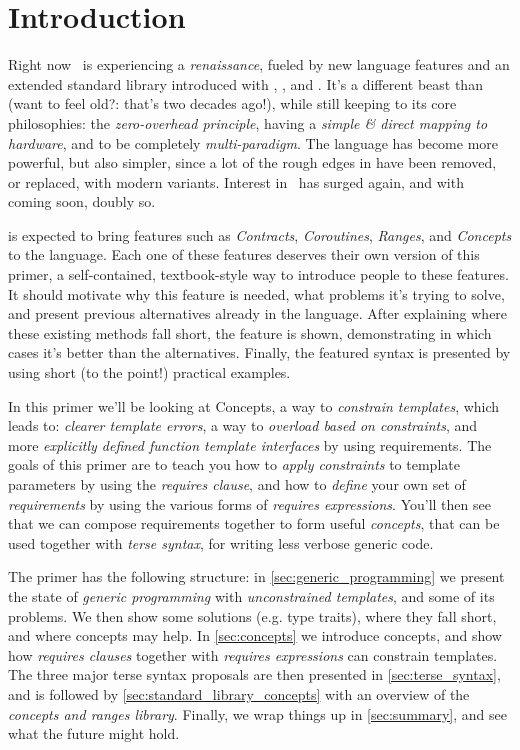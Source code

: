 \section{Introduction} \label{sec:introduction}

Right now \Cpp\ is experiencing a \emph{renaissance}, fueled by new language features and an extended standard library introduced with , , and . It's a different beast than  (want to feel old?: that's two decades ago!), while still keeping to its core philosophies: the \emph{zero-overhead principle}, having a \emph{simple \& direct mapping to hardware}, and to be completely \emph{multi-paradigm}. The language has become more powerful, but also simpler, since a lot of the rough edges in  have been removed, or replaced, with modern variants. Interest in \Cpp\ has surged again, and with  coming soon\texttrademark, doubly so.

 is expected to bring features such as \emph{Contracts}, \emph{Coroutines}, \emph{Ranges}, and \emph{Concepts} to the language. Each one of these features deserves their own version of this primer, a self-contained, textbook-style way to introduce people to these features. It should motivate why this feature is needed, what problems it's trying to solve, and present previous alternatives already in the language. After explaining where these existing methods fall short, the feature is shown, demonstrating in which cases it's better than the alternatives. Finally, the featured syntax is presented by using short (to the point!) practical examples.

In this primer we'll be looking at Concepts, a way to \emph{constrain templates}, which leads to: \emph{clearer template errors}, a way to \emph{overload based on constraints}, and more \emph{explicitly defined function template interfaces} by using requirements. The goals of this primer are to teach you how to \emph{apply constraints} to template parameters by using the \emph{requires clause}, and how to \emph{define} your own set of \emph{requirements} by using the various forms of \emph{requires expressions}. You'll then see that we can compose requirements together to form useful \emph{concepts}, that can be used together with \emph{terse syntax}, for writing less verbose generic code.

The primer has the following structure: in \cref{sec:generic_programming} we present the state of \emph{generic programming} with \emph{unconstrained templates}, and some of its problems. We then show some solutions (e.g. type traits), where they fall short, and where concepts may help. In \cref{sec:concepts} we introduce concepts, and show how \emph{requires clauses} together with \emph{requires expressions} can constrain templates. The three major terse syntax proposals are then presented in \cref{sec:terse_syntax}, and is followed by \cref{sec:standard_library_concepts} with an overview of the \emph{concepts and ranges library}. Finally, we wrap things up in \cref{sec:summary}, and see what the future might hold.

